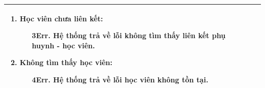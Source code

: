 {\begin{tabularx}{\textwidth}{|>{\raggedright\arraybackslash}p{3.5cm}|>{\raggedright\arraybackslash}X|}
\begin{enumerate}
    \item \textbf{Học viên chưa liên kết:}
    \begin{enumerate}
        \item[3Err.] Hệ thống trả về lỗi không tìm thấy liên kết phụ huynh - học viên.
    \end{enumerate}
    \item \textbf{Không tìm thấy học viên:}
    \begin{enumerate}
        \item[4Err.] Hệ thống trả về lỗi học viên không tồn tại.
    \end{enumerate}
\end{enumerate} \\
\hline
\end{tabularx}
}
